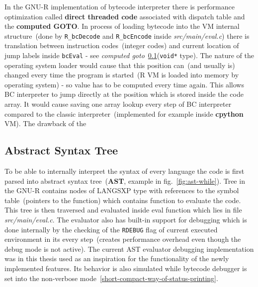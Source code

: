 \documentclass[thesis=M,english]{FITthesis}[2018/10/20]
\newcommand{\code}[1]{\texttt{#1}}
\begin{document}
In the GNU-R implementation of bytecode interpreter there is performance optimization called \textbf{direct threaded code}  associated with dispatch table and the \textbf{computed GOTO}. In process of loading bytecode into the VM internal structure~(done by \code{R{\_}bcDecode} and \code{R{\_}bcEncode} inside \textit{src/main/eval.c}) there is translation between instruction codes~(integer codes) and current location of jump labels inside \code{bcEval} - see \textit{computed goto}~\ref{AST}(\code{void*} type). The nature of the operating system loader would cause that this position can~(and usually is) changed every time the program is started~(R VM is loaded into memory by operating system) - so value has to be computed every time again. This allows BC interpreter to jump directly at the position which is stored inside the code array. It would cause saving one array lookup every step of BC interpreter compared to the classic interpreter~(implemented for example inside \textbf{cpython} VM). The drawback of the 

\subsection{Abstract Syntax Tree}\label{AST}

To be able to internally interpret the syntax of every language the code is first parsed into abstract syntax tree~(\textbf{AST}, example in fig.~\ref{fig:ast-while}). Tree in the GNU-R contains nodes of LANGSXP type with references to the symbol table~(pointers to the function) which contains function to evaluate the code. This tree is then traversed and evaluated inside eval function which lies in file \textit{src/main/eval.c}. The evaluator also has built-in support for debugging which is done internally by the checking of the \code{RDEBUG} flag of current executed environment in its every step~(creates performance overhead even though the debug mode is not active). The current AST evaluator debugging implementation was in this thesis used as an inspiration for the functionality of the newly implemented features. Its behavior is also simulated while bytecode debugger is set into the non-verbose mode~\ref{short-compact-way-of-status-printing}.
\end{document}
